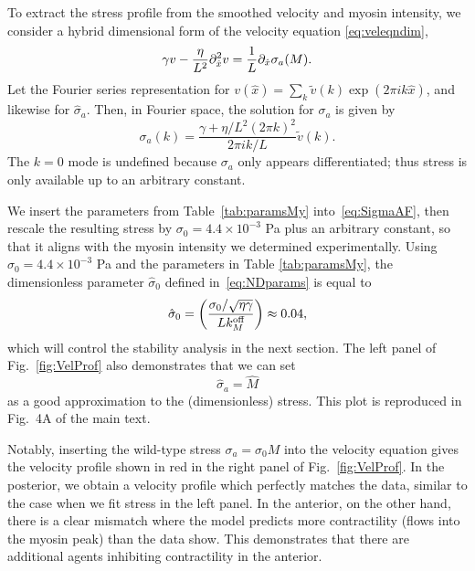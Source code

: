 \documentclass[11pt]{article}
\newcommand{\6}[1]{#1_{\text{6}}}
\newcommand{\3}[1]{#1_{\text{3}}}
\newcommand{\My}[1]{#1_M}
\begin{document}
To extract the stress profile from the smoothed velocity and myosin intensity, we consider a hybrid dimensional form of the velocity equation \eqref{eq:veleqndim},
\begin{equation*}
\gamma v -\frac{ \eta}{L^2} \partial_{\hat{x}}^2 v = \frac{1}{L} \partial_{\hat{x}}  \sigma_a(M). 
\end{equation*}
Let the Fourier series representation for $v(\hat x)= \sum_k \tilde v(k) \exp{\left(2 \pi i k \hat x \right)}$, and likewise for $\hat \sigma_a$. Then, in Fourier space, the solution for $\sigma_a$ is given by 
\begin{equation}
\label{eq:SigmaAF}
\sigma_a(k) = \frac{\gamma+ \eta/L^2 \left(2 \pi k\right)^2}{2 \pi i k/L} \tilde v(k). 
\end{equation}
The $k=0$ mode is undefined because $\sigma_a$ only appears differentiated; thus stress is only available up to an arbitrary constant.

We insert the parameters from Table\ \ref{tab:paramsMy} into\ \eqref{eq:SigmaAF}, then rescale the resulting stress by $\sigma_0=4.4 \times 10^{-3}$ Pa plus an arbitrary constant, so that it aligns with the myosin intensity we determined experimentally. Using $\sigma_0=4.4 \times 10^{-3}$ Pa and the parameters in Table \ref{tab:paramsMy}, the dimensionless parameter $\hat{\sigma}_0$ defined in\ \eqref{eq:NDparams} is equal to
\begin{equation}
\hat{\sigma}_0 = \left(\frac{\sigma_0/ \sqrt{\eta \gamma} }{L \My{\koff}}\right)  \approx 0.04,
\end{equation}
which will control the stability analysis in the next section. The left panel of Fig.\ \ref{fig:VelProf} also demonstrates that we can set 
\begin{equation}
\hat \sigma_a=\hat M
\end{equation}
as a good approximation to the (dimensionless) stress. This plot is reproduced in Fig.\ 4A of the main text.

Notably, inserting the wild-type stress $\sigma_a=\sigma_0 M$ into the velocity equation gives the velocity profile shown in red in the right panel of Fig.\ \ref{fig:VelProf}. In the posterior, we obtain a velocity profile which perfectly matches the data, similar to the case when we fit stress in the left panel. In the anterior, on the other hand, there is a clear mismatch where the model predicts more contractility (flows into the myosin peak) than the data show. This demonstrates that there are additional agents inhibiting contractility in the anterior. 
\end{document}
